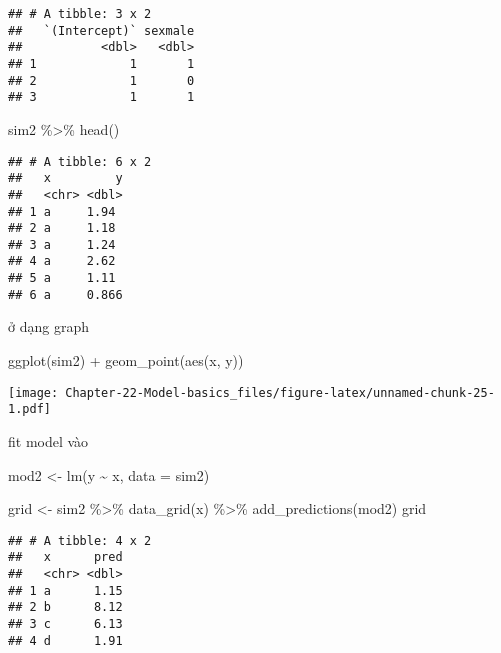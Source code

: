 \documentclass[
]{article}
\newenvironment{Shaded}{\begin{snugshade}}{\end{snugshade}}
\newcommand{\AttributeTok}[1]{\textcolor[rgb]{0.77,0.63,0.00}{#1}}
\newcommand{\FunctionTok}[1]{\textcolor[rgb]{0.00,0.00,0.00}{#1}}
\newcommand{\NormalTok}[1]{#1}
\newcommand{\OtherTok}[1]{\textcolor[rgb]{0.56,0.35,0.01}{#1}}
\newcommand{\SpecialCharTok}[1]{\textcolor[rgb]{0.00,0.00,0.00}{#1}}
\begin{document}
\begin{verbatim}
## # A tibble: 3 x 2
##   `(Intercept)` sexmale
##           <dbl>   <dbl>
## 1             1       1
## 2             1       0
## 3             1       1
\end{verbatim}

\begin{Shaded}
\begin{Highlighting}[]
\NormalTok{sim2 }\SpecialCharTok{\%\textgreater{}\%} \FunctionTok{head}\NormalTok{()}
\end{Highlighting}
\end{Shaded}

\begin{verbatim}
## # A tibble: 6 x 2
##   x         y
##   <chr> <dbl>
## 1 a     1.94 
## 2 a     1.18 
## 3 a     1.24 
## 4 a     2.62 
## 5 a     1.11 
## 6 a     0.866
\end{verbatim}

ở dạng graph

\begin{Shaded}
\begin{Highlighting}[]
\FunctionTok{ggplot}\NormalTok{(sim2) }\SpecialCharTok{+}
  \FunctionTok{geom\_point}\NormalTok{(}\FunctionTok{aes}\NormalTok{(x, y))}
\end{Highlighting}
\end{Shaded}

\texttt{[image: Chapter-22-Model-basics\_files/figure-latex/unnamed-chunk-25-1.pdf]}

fit model vào

\begin{Shaded}
\begin{Highlighting}[]
\NormalTok{mod2 }\OtherTok{\textless{}{-}} \FunctionTok{lm}\NormalTok{(y }\SpecialCharTok{\textasciitilde{}}\NormalTok{ x, }\AttributeTok{data =}\NormalTok{ sim2)}

\NormalTok{grid }\OtherTok{\textless{}{-}}\NormalTok{ sim2 }\SpecialCharTok{\%\textgreater{}\%} 
  \FunctionTok{data\_grid}\NormalTok{(x) }\SpecialCharTok{\%\textgreater{}\%} 
  \FunctionTok{add\_predictions}\NormalTok{(mod2)}
\NormalTok{grid}
\end{Highlighting}
\end{Shaded}

\begin{verbatim}
## # A tibble: 4 x 2
##   x      pred
##   <chr> <dbl>
## 1 a      1.15
## 2 b      8.12
## 3 c      6.13
## 4 d      1.91
\end{verbatim}
\end{document}

